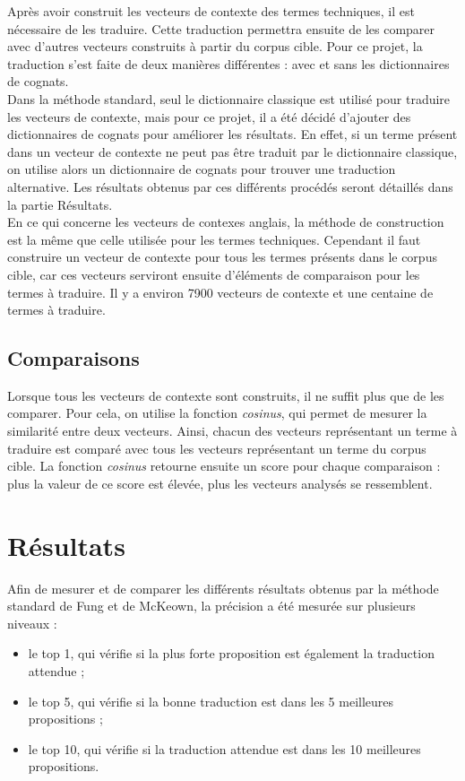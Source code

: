 	Après avoir construit les vecteurs de contexte des termes techniques, il est nécessaire de les traduire. Cette traduction permettra ensuite de les comparer avec d'autres vecteurs construits à partir du corpus cible. Pour ce projet, la traduction s'est faite de deux manières différentes : avec et sans les dictionnaires de cognats.\\
	
	Dans la méthode standard, seul le dictionnaire classique est utilisé pour traduire les vecteurs de contexte, mais pour ce projet, il a été décidé d'ajouter des dictionnaires de cognats pour améliorer les résultats. En effet, si un terme présent dans un vecteur de contexte ne peut pas être traduit par le dictionnaire classique, on utilise alors un dictionnaire de cognats pour trouver une traduction alternative. Les résultats obtenus par ces différents procédés seront détaillés dans la partie Résultats.\\
	
	En ce qui concerne les vecteurs de contexes anglais, la méthode de construction est la même que celle utilisée pour les termes techniques. Cependant il faut construire un vecteur de contexte pour tous les termes présents dans le corpus cible, car ces vecteurs serviront ensuite d'éléments de comparaison pour les termes à traduire. Il y a environ 7900 vecteurs de contexte et une centaine de termes à traduire.
	
	\subsection{Comparaisons}
	
	Lorsque tous les vecteurs de contexte sont construits, il ne suffit plus que de les comparer. Pour cela, on utilise la fonction \textit{cosinus}, qui permet de mesurer la similarité entre deux vecteurs. Ainsi, chacun des vecteurs représentant un terme à traduire est comparé avec tous les vecteurs représentant un terme du corpus cible. La fonction \textit{cosinus} retourne ensuite un score pour chaque comparaison : plus la valeur de ce score est élevée, plus les vecteurs analysés se ressemblent.
	

\section{Résultats}
	
	Afin de mesurer et de comparer les différents résultats obtenus par la méthode standard de Fung et de McKeown, la précision a été mesurée sur plusieurs niveaux : 
	\begin{itemize}
		\item le top 1, qui vérifie si la plus forte proposition est également la traduction attendue ;
		\item le top 5, qui vérifie si la bonne traduction est dans les 5 meilleures propositions ;
		\item le top 10, qui vérifie si la traduction attendue est dans les 10 meilleures propositions.
	\end{itemize}
	
